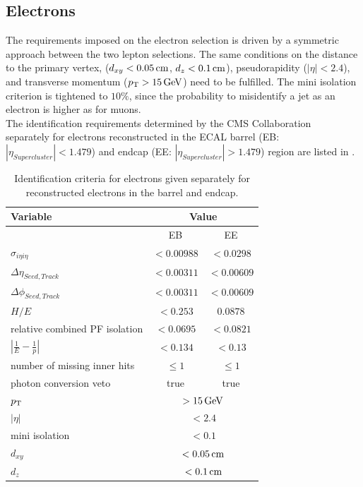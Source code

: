 \subsection{Electrons}
The requirements imposed on the electron selection is driven by a symmetric approach between the two lepton selections. The same conditions on the distance to the primary vertex, ($d_{xy}<0.05\,\text{cm}$, $d_z<0.1\,\text{cm}$), pseudorapidity ($|\eta|<2.4$), and transverse momentum ($p_{\mathrm{T}}>15\,\text{Ge\hspace{-.08em}V}$) need to be fulfilled. The mini isolation criterion is tightened to $10\%$, since the probability to misidentify a jet as an electron is higher as for muons.\\
The identification requirements determined by the CMS Collaboration~\cite{ElectronID} separately for electrons reconstructed in the ECAL barrel (EB: $|\eta_{Supercluster}|<1.479$) and endcap (EE: $|\eta_{Supercluster}|>1.479$) region are listed in .
\begin{table}[bp]
 \centering
 \caption{Identification criteria for electrons given separately for reconstructed electrons in the barrel and endcap.}
 \label{tab:eleID}
 \begin{tabular}{lcc}
  Variable                       & \multicolumn{2}{c}{Value}                   \\\hline
                                 & EB                             & EE         \\\hline
  $\sigma_{i\eta i\eta}$         & $<0.00988$                     & $<0.0298$  \\
  $\Delta\eta_{Seed,Track}$      & $<0.00311$                     & $<0.00609$ \\
  $\Delta\phi_{Seed,Track}$      & $<0.00311$                     & $<0.00609$ \\
  $H/E$                          & $<0.253$                       & $0.0878$   \\
  relative combined PF isolation & $<0.0695$                      & $<0.0821$  \\
  $|\frac{1}{E}-\frac{1}{p}|$    & $<0.134$                       & $<0.13$    \\
  number of missing inner hits   & $\leq1$                        & $\leq1$    \\
  photon conversion veto         & true                           & true       \\\hline
  $p_{\mathrm{T}}$                          & \multicolumn{2}{c}{$>15\,\text{Ge\hspace{-.08em}V}$}               \\
  $|\eta|$                       & \multicolumn{2}{c}{$<2.4$}                  \\
  mini isolation                 & \multicolumn{2}{c}{$<0.1$}                  \\
  $d_{xy}$                       & \multicolumn{2}{c}{$<0.05\,\text{cm}$}              \\
  $d_z$                          & \multicolumn{2}{c}{$<0.1\,\text{cm}$}               \\\hline
 \end{tabular}
 \vspace{\baselineskip}
\end{table}

